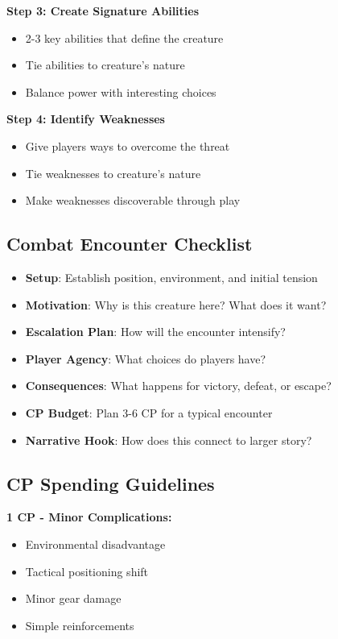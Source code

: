 \documentclass[12pt]{article}
\begin{document}
\begin{itemize}
\textbf{Step 3: Create Signature Abilities}
\begin{itemize}
\item 2-3 key abilities that define the creature
\item Tie abilities to creature's nature
\item Balance power with interesting choices
\end{itemize}

\textbf{Step 4: Identify Weaknesses}
\begin{itemize}
\item Give players ways to overcome the threat
\item Tie weaknesses to creature's nature
\item Make weaknesses discoverable through play
\end{itemize}

\subsection*{Combat Encounter Checklist}

\begin{itemize}
\item \textbf{Setup}: Establish position, environment, and initial tension
\item \textbf{Motivation}: Why is this creature here? What does it want?
\item \textbf{Escalation Plan}: How will the encounter intensify?
\item \textbf{Player Agency}: What choices do players have?
\item \textbf{Consequences}: What happens for victory, defeat, or escape?
\item \textbf{CP Budget}: Plan 3-6 CP for a typical encounter
\item \textbf{Narrative Hook}: How does this connect to larger story?
\end{itemize}

\subsection*{CP Spending Guidelines}

\textbf{1 CP - Minor Complications:}
\begin{itemize}
\item Environmental disadvantage
\item Tactical positioning shift
\item Minor gear damage
\item Simple reinforcements
\end{itemize}


\end{itemize}
\end{document}
